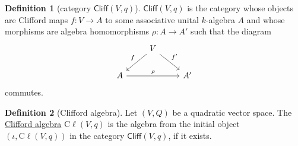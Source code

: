 \documentclass[a4paper]{report}
\newcommand{\defn}[1]{\ul{#1}}
\newcommand{\cliff}{\mathrm{C}\ell}
\theoremstyle{definition}
\newtheorem{definition}{Definition}[section]
\theoremstyle{plain}
\theoremstyle{remark}
\begin{document}
\begin{definition}[category $\mathsf{Cliff}(V,q)$]
  \label{def:cliffordcategory}
  $\mathsf{Cliff}(V,q)$ is the category whose objects are Clifford maps $f\colon V \to A$ to some associative unital $k$-algebra $A$ and whose morphisms are algebra homomorphisms $\rho\colon A \to A'$ such that the diagram
  \begin{equation*}
    \begin{tikzcd}
      & V \arrow[dl, swap, "f"] \arrow[dr, "f'"] & \\
      A \arrow[rr, "\rho"] & & A'
    \end{tikzcd}
  \end{equation*}
  commutes.
\end{definition}

\begin{definition}[Clifford algebra]
  \label{def:cliffordalgebra}
  Let $(V,Q)$ be a quadratic vector space. The \defn{Clifford algebra} $\cliff(V,q)$ is the algebra from the initial object $(\iota, \cliff(V,q))$ in the category $\mathsf{Cliff}(V,q)$, if it exists.
\end{definition}
\end{document}
